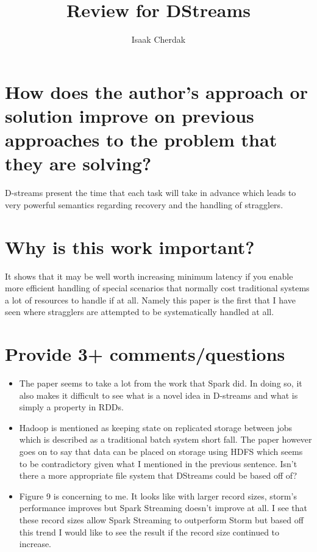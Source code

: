\documentclass{article}
\title{Review for DStreams}
\author{Isaak Cherdak}
\begin{document}
\maketitle

\section{How does the author's approach or solution improve on previous
approaches to the problem that they are solving?}

D-streams present the time that each task will take in advance which leads to
very powerful semantics regarding recovery and the handling of stragglers.

\section{Why is this work important?}

It shows that it may be well worth increasing minimum latency if you enable more
efficient handling of special scenarios that normally cost traditional systems a
lot of resources to handle if at all. Namely this paper is the first that I have
seen where stragglers are attempted to be systematically handled at all.

\section{Provide 3+ comments/questions}

\begin{itemize}
  \item The paper seems to take a lot from the work that Spark did. In doing so,
    it also makes it difficult to see what is a novel idea in D-streams and what
    is simply a property in RDDs.
  \item Hadoop is mentioned as keeping state on replicated storage between jobs
    which is described as a traditional batch system short fall. The paper
    however goes on to say that data can be placed on storage using HDFS which
    seems to be contradictory given what I mentioned in the previous sentence.
    Isn't there a more appropriate file system that DStreams could be based off
    of?
  \item Figure 9 is concerning to me. It looks like with larger record sizes,
    storm's performance improves but Spark Streaming doesn't improve at all. I
    see that these record sizes allow Spark Streaming to outperform Storm but
    based off this trend I would like to see the result if the record size
    continued to increase.
\end{itemize}
\end{document}

